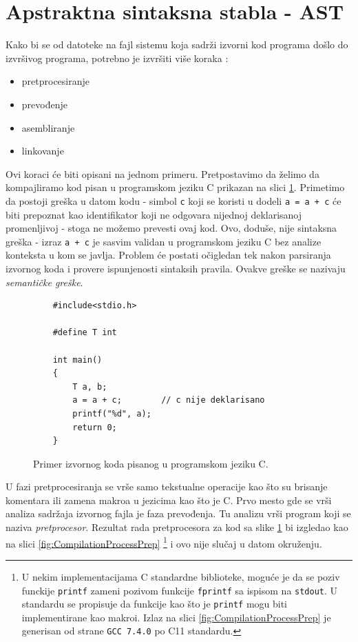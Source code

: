 \section{Apstraktna sintaksna stabla - AST}
\label{sec:AST}

Kako bi se od datoteke na fajl sistemu koja sadrži izvorni kod programa 
došlo do izvršivog programa, potrebno je izvršiti više koraka 
\cite{CompilerConstruction}:
\begin{itemize}
    \item pretprocesiranje
    \item prevođenje
    \item asembliranje
    \item linkovanje
\end{itemize}

Ovi koraci će biti opisani na jednom primeru. Pretpostavimo da želimo 
da kompajliramo kod pisan u programskom jeziku C prikazan na slici 
\ref{fig:CompilationProcessInit}. Primetimo da postoji greška u datom
kodu - simbol \texttt{c} koji se koristi u dodeli \texttt{a = a + c} 
će biti prepoznat kao identifikator koji ne odgovara nijednoj 
deklarisanoj promenljivoj - stoga ne možemo prevesti ovaj kod. Ovo, 
doduše, nije sintaksna greška - izraz \texttt{a + c} je sasvim validan 
u programskom jeziku C bez analize konteksta u kom se javlja. Problem 
će postati očigledan tek nakon parsiranja izvornog koda i provere 
ispunjenosti sintaksih pravila. Ovakve greške se nazivaju 
\emph{semantičke greške}.

\begin{figure}[h!]
    \begin{lstlisting}
    #include<stdio.h>

    #define T int

    int main()
    {
        T a, b;
        a = a + c;        // c nije deklarisano
        printf("%d", a);
        return 0;
    }
    \end{lstlisting}
    \caption{Primer izvornog koda pisanog u programskom jeziku C.}
    \label{fig:CompilationProcessInit}
\end{figure}

U fazi pretprocesiranja se vrše samo tekstualne operacije kao što su
brisanje komentara ili zamena makroa u jezicima kao što je C. Prvo 
mesto gde se vrši analiza sadržaja izvornog fajla je faza prevođenja.
Tu analizu vrši program koji se naziva \emph{pretprocesor}. Rezultat 
rada pretprocesora za kod sa slike \ref{fig:CompilationProcessInit} 
bi izgledao kao na slici \ref{fig:CompilationProcessPrep} \footnote{
U nekim implementacijama C standardne biblioteke, moguće je da se 
poziv funckije \texttt{printf} zameni pozivom funkcije \texttt{fprintf}
sa ispisom na \texttt{stdout}. U standardu se propisuje da funkcije 
kao što je \texttt{printf} mogu biti implementirane kao makroi. Izlaz 
na slici \ref{fig:CompilationProcessPrep} je generisan od strane 
\texttt{GCC 7.4.0} po C11 standardu.} i ovo nije slučaj u datom 
okruženju.

